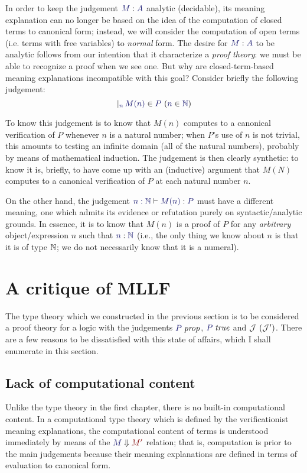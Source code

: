 In order to keep the judgement $\ofty{M}{A}$ analytic (decidable), its meaning
explanation can no longer be based on the idea of the computation of closed
terms to canonical form; instead, we will consider the computation of open
terms (i.e. terms with free variables) to \emph{normal} form. The desire for
$\ofty{M}{A}$ to be analytic follows from our intention that it characterize a
\emph{proof theory}: we must be able to recognize a proof when we see one. But
why are closed-term-based meaning explanations incompatible with this goal?
Consider briefly the following judgement:
\[
  \genj{n}{\hyp{\ver{M(n)}{P}}{\ver{n}{\naturals}}}
\]

To know this judgement is to know that $M(n)$ computes to a canonical
verification of $P$ whenever $n$ is a natural number; when $P$'s use of $n$ is
not trivial, this amounts to testing an infinite domain (all of the natural
numbers), probably by means of mathematical induction. The judgement is then
clearly synthetic: to know it is, briefly, to have come up with an (inductive)
argument that $M(N)$ computes to a canonical verification of $P$ at each
natural number $n$.

On the other hand, the judgement $\lfsequent{n:\naturals}{\ofty{M(n)}{P}}$ must have a
different meaning, one which admits its evidence or refutation purely on
syntactic/analytic grounds. In essence, it is to know that $M(n)$ is a proof of
$P$ for any \emph{arbitrary} object/expression $n$ such that $\ofty{n}{\naturals}$
(i.e., the only thing we know about $n$ is that it is of type $\mathbb{N}$; we
do not necessarily know that it is a numeral).


\section{A critique of \textbf{MLLF}}

The type theory which we constructed in the previous section is to be
considered a proof theory for a logic with the judgements
$\isprop{P}$, $\istrue{P}$ and
$\mathcal{J}\ (\mathcal{J}')$. There are a few reasons to be
dissatisfied with this state of affairs, which I shall enumerate in
this section.

\subsection{Lack of computational content}

Unlike the type theory in the first chapter, there is no built-in computational
content. In a computational type theory which is defined by the verificationist
meaning explanations, the computational content of terms is understood
immediately by means of the $\reduce{M}{M'}$ relation; that is, computation is
prior to the main judgements because their meaning explanations are defined in
terms of evaluation to canonical form.

